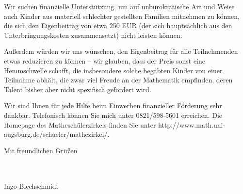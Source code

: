 \documentclass{../vorlagen/werbung/lehrerbriefe/zirkelbrief}
\begin{document}
\newpage

Wir suchen finanzielle Unterstützung, um auf unbürokratische Art und
Weise auch Kinder aus materiell schlechter gestellten Familien mitnehmen
zu können, die sich den Eigenbeitrag von etwa 250 EUR (der sich
hauptsächlich aus den Unterbringungskosten zusammensetzt) nicht leisten
können.

Außerdem würden wir uns wünschen, den Eigenbeitrag für alle
Teilnehmenden etwas reduzieren zu können -- wir glauben, dass der Preis
sonst eine Hemmschwelle schafft, die insbesondere solche begabten Kinder
von einer Teilnahme abhält, die zwar viel Freude an der Mathematik
empfinden, deren Talent bisher aber nicht spezifisch gefördert wird.

Wir sind Ihnen für jede Hilfe beim Einwerben finanzieller Förderung sehr
dankbar. Telefonisch können Sie mich unter 0821/598-5601 erreichen. Die
Homepage des Matheschülerzirkels finden Sie unter
\textsf{http:/\!/www.math.uni-augsburg.de/schue\-ler/mathezirkel/}.

Mit freundlichen Grüßen

\ \\
\ \\

Ingo Blechschmidt
\end{document}
